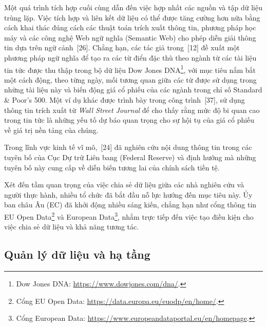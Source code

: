 Một quá trình tích hợp cuối cùng dẫn đến việc hợp nhất các nguồn và tập dữ liệu trùng lặp. Việc tích hợp và liên kết dữ liệu có thể được tăng cường hơn nữa bằng cách khai thác đúng cách các thuật toán trích xuất thông tin, phương pháp học máy và các công nghệ Web ngữ nghĩa (Semantic Web) cho phép diễn giải thông tin dựa trên ngữ cảnh~[26]. Chẳng hạn, các tác giả trong~[12] đề xuất một phương pháp ngữ nghĩa để tạo ra các từ điển đặc thù theo ngành từ các tài liệu tin tức được thu thập trong bộ dữ liệu Dow Jones DNA\footnote{Dow Jones DNA: \url{https://www.dowjones.com/dna/}.}, với mục tiêu nắm bắt một cách động, theo từng ngày, mối tương quan giữa các từ được sử dụng trong những tài liệu này và biến động giá cổ phiếu của các ngành trong chỉ số Standard \& Poor's 500. Một ví dụ khác được trình bày trong công trình~[37], sử dụng thông tin trích xuất từ \emph{Wall Street Journal} để cho thấy rằng mức độ bi quan cao trong tin tức là những yếu tố dự báo quan trọng cho sự hội tụ của giá cổ phiếu về giá trị nền tảng của chúng.

Trong lĩnh vực kinh tế vĩ mô,~[24] đã nghiên cứu nội dung thông tin trong các tuyên bố của Cục Dự trữ Liên bang (Federal Reserve) và định hướng mà những tuyên bố này cung cấp về diễn biến tương lai của chính sách tiền tệ.

Xét đến tầm quan trọng của việc chia sẻ dữ liệu giữa các nhà nghiên cứu và người thực hành, nhiều tổ chức đã bắt đầu nỗ lực hướng đến mục tiêu này. Ủy ban châu Âu (EC) đã khởi động nhiều sáng kiến, chẳng hạn như cổng thông tin EU Open Data\footnote{Cổng EU Open Data: \url{https://data.europa.eu/euodp/en/home/}.} và European Data\footnote{Cổng European Data: \url{https://www.europeandataportal.eu/en/homepage}.}, nhắm trực tiếp đến việc tạo điều kiện cho việc chia sẻ dữ liệu và khả năng tương tác.

\subsection{Quản lý dữ liệu và hạ tầng}

